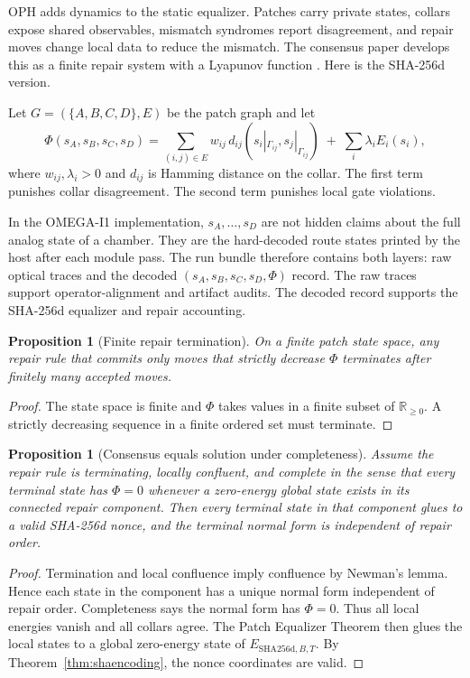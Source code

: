 \documentclass[11pt]{article}
\newtheorem{proposition}[theorem]{Proposition}
\theoremstyle{definition}
\theoremstyle{remark}
\newcommand{\shaD}{\mathrm{SHA256d}}
\begin{document}
OPH adds dynamics to the static equalizer. Patches carry private states,
collars expose shared observables, mismatch syndromes report disagreement, and
repair moves change local data to reduce the mismatch. The consensus paper
develops this as a finite repair system with a Lyapunov function
\cite{OPHConsensusCurrent}. Here is the SHA-256d version.

Let \(G=(\{A,B,C,D\},E)\) be the patch graph and let
\[
\Phi(s_A,s_B,s_C,s_D)
=
\sum_{(i,j)\in E}
w_{ij}\,
d_{ij}\!\left(s_i|_{\Gamma_{ij}},s_j|_{\Gamma_{ij}}\right)
\;+\;
\sum_i \lambda_i E_i(s_i),
\]
where \(w_{ij},\lambda_i>0\) and \(d_{ij}\) is Hamming distance on the collar.
The first term punishes collar disagreement. The second term punishes local
gate violations.

In the OMEGA-I1 implementation, \(s_A,\ldots,s_D\) are not hidden claims about
the full analog state of a chamber. They are the hard-decoded route states
printed by the host after each module pass. The run bundle therefore contains
both layers: raw optical traces and the decoded \((s_A,s_B,s_C,s_D,\Phi)\)
record. The raw traces support operator-alignment and artifact audits. The
decoded record supports the SHA-256d equalizer and repair accounting.

\begin{proposition}[Finite repair termination]
\label{prop:repairtermination}
On a finite patch state space, any repair rule that commits only moves that
strictly decrease \(\Phi\) terminates after finitely many accepted moves.
\end{proposition}

\begin{proof}
The state space is finite and \(\Phi\) takes values in a finite subset of
\(\mathbb R_{\ge 0}\). A strictly decreasing sequence in a finite ordered set
must terminate.
\end{proof}

\begin{proposition}[Consensus equals solution under completeness]
\label{prop:repaircomplete}
Assume the repair rule is terminating, locally confluent, and complete in the
sense that every terminal state has \(\Phi=0\) whenever a zero-energy global
state exists in its connected repair component. Then every terminal state in
that component glues to a valid SHA-256d nonce, and the terminal normal form is
independent of repair order.
\end{proposition}

\begin{proof}
Termination and local confluence imply confluence by Newman's lemma. Hence each
state in the component has a unique normal form independent of repair order.
Completeness says the normal form has \(\Phi=0\). Thus all local energies vanish
and all collars agree. The Patch Equalizer Theorem then glues the local states
to a global zero-energy state of \(E_{\shaD,B,T}\). By
Theorem~\ref{thm:shaencoding}, the nonce coordinates are valid.
\end{proof}
\end{document}
